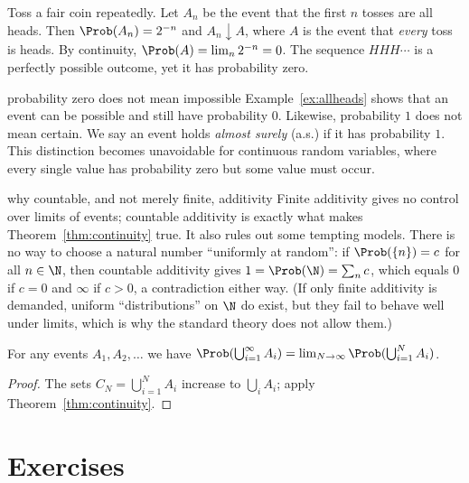 \begin{example}\label{ex:allheads}
Toss a fair coin repeatedly. Let $A_n$ be the event that the first $n$ tosses
are all heads. Then $\Prob(A_n)=2^{-n}$ and $A_n\downarrow A$, where $A$ is the
event that \emph{every} toss is heads. By continuity,
$\Prob(A)=\lim_n2^{-n}=0$. The sequence $HHH\cdots$ is a perfectly possible
outcome, yet it has probability zero.
\end{example}

\begin{nuance}{probability zero does not mean impossible}
Example~\ref{ex:allheads} shows that an event can be possible and still have
probability $0$. Likewise, probability $1$ does not mean certain. We say an
event holds \emph{almost surely} (a.s.) if it has probability $1$. This
distinction becomes unavoidable for continuous random variables, where every
single value has probability zero but some value must occur.
\end{nuance}

\begin{nuance}{why countable, and not merely finite, additivity}
Finite additivity gives no control over limits of events; countable additivity
is exactly what makes Theorem~\ref{thm:continuity} true. It also rules out
some tempting models. There is no way to choose a natural number ``uniformly at
random'': if $\Prob(\{n\})=c$ for all $n\in\N$, then countable additivity gives
$1=\Prob(\N)=\sum_{n}c$, which equals $0$ if $c=0$ and $\infty$ if $c>0$,
a contradiction either way. (If only finite additivity is demanded, uniform
``distributions'' on $\N$ do exist, but they fail to behave well under limits,
which is why the standard theory does not allow them.)
\end{nuance}

\begin{corollary}
For any events $A_1,A_2,\dots$ we have
$\Prob(\bigcup_{i=1}^\infty A_i)=\lim_{N\to\infty}\Prob(\bigcup_{i=1}^NA_i)$.
\end{corollary}
\begin{proof}
The sets $C_N=\bigcup_{i=1}^NA_i$ increase to $\bigcup_iA_i$; apply
Theorem~\ref{thm:continuity}.
\end{proof}

\section*{Exercises}


